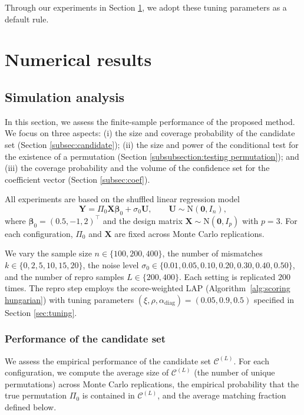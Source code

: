 \documentclass[11pt, reqno]{amsart}
\newcommand{\1}{\mbox{1}\hspace{-0.25em}\mbox{l}}
\newcommand{\Normal}{\mathrm{N}}
\theoremstyle{definition}\newtheorem{problem}{Problem}[section]
\theoremstyle{definition}\newtheorem{definition}[problem]{Definition}
\theoremstyle{remark}\newtheorem{assumption}{Assumption}
\theoremstyle{remark}\newtheorem{remark}[problem]{Remark}
\theoremstyle{definition}\newtheorem{example}[problem]{Example}
\theoremstyle{plain}\newtheorem{theorem}[problem]{Theorem}
\theoremstyle{plain}\newtheorem{question}[problem]{Question}
\theoremstyle{plain}\newtheorem{lemma}[problem]{Lemma}
\theoremstyle{plain}\newtheorem{proposition}[problem]{Proposition}
\theoremstyle{plain}\newtheorem{corollary}[problem]{Corollary}
\theoremstyle{plain}\newtheorem{conjecture}[problem]{Conjecture}
\begin{document}
Through our experiments in Section \ref{sec:numerical}, we adopt these tuning parameters as a default rule. 



\section{Numerical results}\label{sec:numerical}

\subsection{Simulation analysis}
In this section, we assess the finite-sample performance of the proposed method.
We focus on three aspects:
(i) the size and coverage probability of the candidate set (Section \ref{subsec:candidate});
(ii) the size and power of the conditional test for the existence of a permutation (Section \ref{subsubsection:testing permutation}); and
(iii) the coverage probability and the volume of the confidence set for the coefficient vector (Section \ref{subsec:coef}).

All experiments are based on the shuffled linear regression model
\[
\bm{Y} = \Pi_0 \bm{X}\bm{\beta}_0 + \sigma_0 \bm{U}, \qquad \bm{U}\sim\Normal(\bm{0}, I_n),
\]
where $\bm{\beta}_0=(0.5,-1,2)^\top$ and the design matrix $\bm{X} \sim\Normal(\bm{0},I_p)$ with $p=3$.
For each configuration, $\Pi_0$ and $\bm{X}$ are fixed across Monte Carlo replications.

We vary the sample size $n\in\{100,200,400\}$, the number of mismatches $k\in\{0,2,5,10,15,20\}$,
the noise level $\sigma_0\in\{0.01,0.05,0.10,0.20,0.30,0.40,0.50\}$,
and the number of repro samples $L\in\{200,400\}$.
Each setting is replicated $200$ times.
The repro step employs the score-weighted LAP (Algorithm~\ref{alg:scoring hungarian})
with tuning parameters $(\xi,\rho,\alpha_{\mathrm{diag}})=(0.05,0.9,0.5)$ specified in Section \ref{sec:tuning}.

\subsubsection{Performance of the candidate set}
We assess the empirical performance of the candidate set $\mathcal{C}^{(L)}$.
For each configuration, we compute the average size of $\mathcal{C}^{(L)}$ (the number of unique permutations) across Monte Carlo replications, the empirical probability that the true permutation $\Pi_0$ is contained in $\mathcal{C}^{(L)}$, and the average matching fraction defined below.
\end{document}
